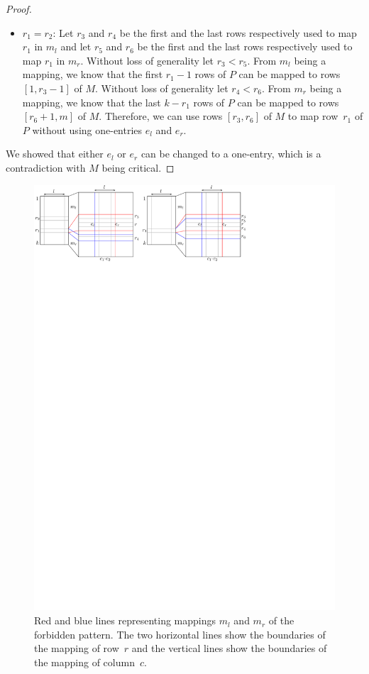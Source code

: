 \begin{proof}
\begin{itemize}
\begin{itemize}
		\item $r_1=r_2$: Let $r_3$ and $r_4$ be the first and the last rows respectively used to map $r_1$ in $m_l$ and let $r_5$ and $r_6$ be the first and the last rows respectively used to map $r_1$ in $m_r$. Without loss of generality let $r_3<r_5$. From $m_l$ being a mapping, we know that the first $r_1-1$ rows of $P$ can be mapped to rows $[1,r_3-1]$ of $M$. Without loss of generality let $r_4<r_6$. From $m_r$ being a mapping, we know that the last $k-r_1$ rows of $P$ can be mapped to rows $[r_6+1,m]$ of $M$. Therefore, we can use rows $[r_3,r_6]$ of $M$ to map row~$r_1$ of $P$ without using one-entries $e_l$ and $e_r$.
	\end{itemize}
\end{itemize}
We showed that either $e_l$ or $e_r$ can be changed to a one-entry, which is a contradiction with $M$ being critical.
\end{proof}

\begin{figure}[!ht]
\centering
\includegraphics[width=\textwidth]{img/emptymidcol.pdf}
\caption{Red and blue lines representing mappings $m_l$ and $m_r$ of the forbidden pattern. The two horizontal lines show the boundaries of the mapping of row~$r$ and the vertical lines show the boundaries of the mapping of column~$c$.}
\label{fig:emptymid}
\end{figure}

